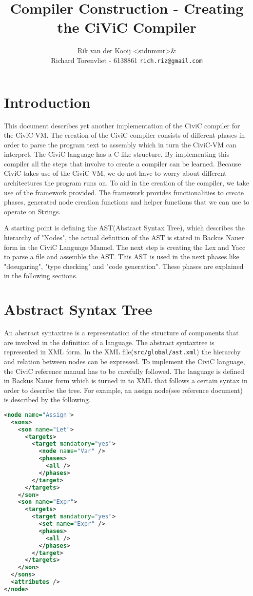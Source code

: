 \documentclass[a4paper]{article}
\author{Rik van der Kooij <stdnmmr>\& \\
Richard Torenvliet - 6138861 \texttt{rich.riz@gmail.com}}
\title{Compiler Construction - Creating the CiViC Compiler}
\begin{document}
\lstset{
    numbers=left,
    tabsize=2,
}


\tableofcontents
\maketitle
\section{Introduction}
This document describes yet another implementation of the CiviC compiler for
the CiviC-VM. The creation of the CiviC compiler consists of different phases
in order to parse the program text to assembly which in turn the CiviC-VM can
interpret. The CiviC language has a C-like structure. By implementing this
compiler all the steps that involve to create a compiler can be learned.
Because CiviC takes use of the CiviC-VM, we do not have to worry about
different architectures the program runs on. To aid in the creation of the
compiler, we take use of the framework provided. The framework provides
functionalities to create phases, generated node creation functions and helper
functions that we can use to operate on Strings.

A starting point is defining the AST(Abstract Syntax Tree), which
describes the hierarchy of "Nodes", the actual definition of the AST is stated
in Backus Nauer form in the CiviC Language Manuel. The next step is creating the Lex and Yacc to parse a
file and assemble the AST. This AST is used in the next phases like "desugaring", "type checking" and "code generation". These phases are explained in the following sections.

\section{Abstract Syntax Tree}
An abstract syntaxtree is a representation of the structure of components that
are involved in the definition of a language.
The abstract syntaxtree is represented in XML form. In the XML
file(\texttt{src/global/ast.xml}) the hierarchy and relation between nodes can
be expressed. To implement the CiviC language, the CiviC reference manual has
to be carefully followed. The language is defined in Backus Nauer form which is
turned in to XML that follows a certain syntax in order to describe the tree.
For example, an assign node(see reference document) is described by the
following.

\begin{lstlisting}[language=XML]
 <node name="Assign">
  <sons>
    <son name="Let">
      <targets>
        <target mandatory="yes">
          <node name="Var" />
          <phases>
            <all />
          </phases>
        </target>
      </targets>
    </son>
    <son name="Expr">
      <targets>
        <target mandatory="yes">
          <set name="Expr" />
          <phases>
            <all />
          </phases>
        </target>
      </targets>
    </son>
  </sons>
  <attributes />
</node>
\end{lstlisting}
\end{document}
